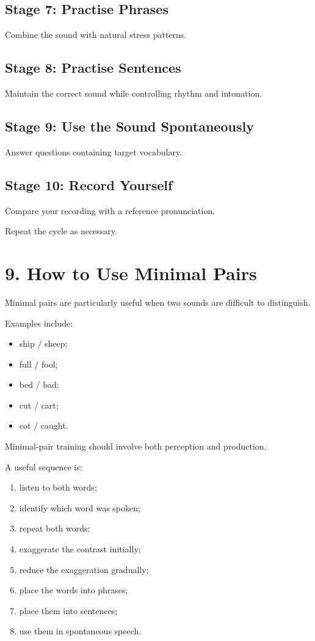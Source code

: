 \subsection*{Stage 7: Practise Phrases}

Combine the sound with natural stress patterns.

\subsection*{Stage 8: Practise Sentences}

Maintain the correct sound while controlling rhythm and intonation.

\subsection*{Stage 9: Use the Sound Spontaneously}

Answer questions containing target vocabulary.

\subsection*{Stage 10: Record Yourself}

Compare your recording with a reference pronunciation.

Repeat the cycle as necessary.

\section*{9. How to Use Minimal Pairs}

Minimal pairs are particularly useful when two sounds are difficult to distinguish.

Examples include:

\begin{itemize}
    \item ship / sheep;
    \item full / fool;
    \item bed / bad;
    \item cut / cart;
    \item cot / caught.
\end{itemize}

Minimal-pair training should involve both perception and production.

A useful sequence is:

\begin{enumerate}
    \item listen to both words;
    \item identify which word was spoken;
    \item repeat both words;
    \item exaggerate the contrast initially;
    \item reduce the exaggeration gradually;
    \item place the words into phrases;
    \item place them into sentences;
    \item use them in spontaneous speech.
\end{enumerate}


